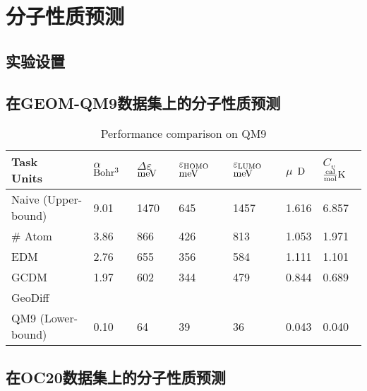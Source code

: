 \section{分子性质预测}

\subsection{实验设置}

\subsection{在GEOM-QM9数据集上的分子性质预测}

\begin{table}[h]
    \centering
    \caption{Performance comparison on QM9}
    \label{tab:exp_qm9_reg}
    \begin{tabular}{lllllll}
    \hline
    \makecell[l]{Task\\Units} & \makecell[l]{$\alpha$\\${\rm Bohr^3}$} & \makecell[l]{$\Delta \varepsilon$\\${\rm meV}$} & \makecell[l]{$\varepsilon_{{\rm HOMO}}$\\${\rm meV}$} & \makecell[l]{$\varepsilon_{{\rm LUMO}}$\\${\rm meV}$} & \makecell[l]{$\mu$\\${\rm D}$} & \makecell[l]{$C_v$\\$\frac{{\rm cal}}{{\rm mol}}{\rm K}$} \\
    \hline
    Naive (Upper-bound) & 9.01 & 1470 & 645 & 1457 & 1.616 & 6.857 \\
    \# Atom & 3.86 & 866 & 426 & 813 & 1.053 & 1.971 \\
    EDM & 2.76 & 655 & 356 & 584 & 1.111 & 1.101 \\
    GCDM & 1.97 & 602 & 344 & 479 & 0.844 & 0.689 \\
    GeoDiff &  &  &  &  &  & \\
    QM9 (Lower-bound) & 0.10 & 64 & 39 & 36 & 0.043 & 0.040 \\
    \hline
    \end{tabular}
\end{table}

\subsection{在OC20数据集上的分子性质预测}

